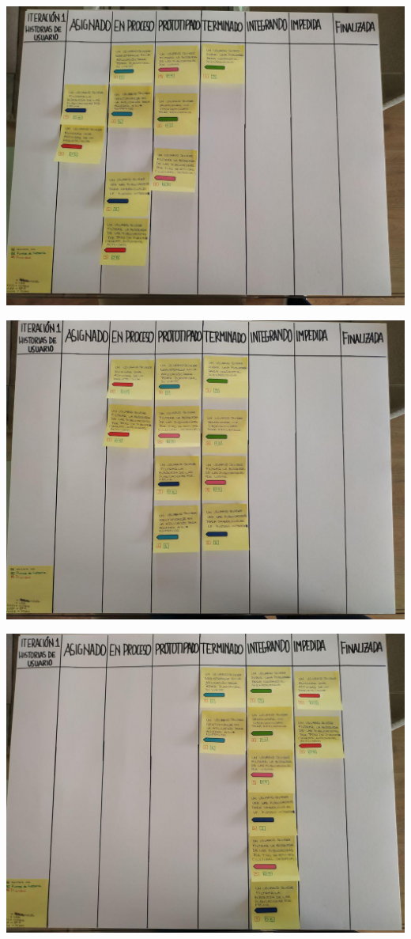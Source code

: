\documentclass[spanish]{beamer}
\begin{document}
\begin{frame}
	\begin{center}
		\includegraphics[angle=0, scale=0.34]{papel1_6}
	\end{center}
\end{frame}


\begin{frame}
	\begin{center}
		\includegraphics[angle=90, scale=0.34]{papel1_8}
	\end{center}
\end{frame}


\begin{frame}
	\begin{center}
		\includegraphics[angle=180, scale=0.33]{papel1_9}
	\end{center}
\end{frame}
\end{document}
